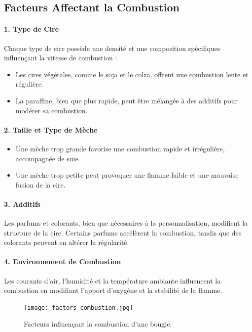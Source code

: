 \documentclass[11pt,fleqn,onecolumn,oneside]{book}
\begin{document}
\subsection*{Facteurs Affectant la Combustion}

\paragraph{1. Type de Cire}
Chaque type de cire possède une densité et une composition spécifiques influençant la vitesse de combustion :
\begin{itemize}
    \item Les cires végétales, comme le soja et le colza, offrent une combustion lente et régulière.
    \item La paraffine, bien que plus rapide, peut être mélangée à des additifs pour modérer sa combustion.
\end{itemize}

\paragraph{2. Taille et Type de Mèche}
\begin{itemize}
    \item Une mèche trop grande favorise une combustion rapide et irrégulière, accompagnée de suie.
    \item Une mèche trop petite peut provoquer une flamme faible et une mauvaise fusion de la cire.
\end{itemize}

\paragraph{3. Additifs}
Les parfums et colorants, bien que nécessaires à la personnalisation, modifient la structure de la cire. Certains parfums accélèrent la combustion, tandis que des colorants peuvent en altérer la régularité.

\paragraph{4. Environnement de Combustion}
Les courants d'air, l'humidité et la température ambiante influencent la combustion en modifiant l’apport d’oxygène et la stabilité de la flamme.


\begin{figure}[H]
    \centering
    \texttt{[image: factors\_combustion.jpg]}
    \caption{Facteurs influençant la combustion d’une bougie.}
    \label{fig:factors_combustion}
\end{figure}
\end{document}
